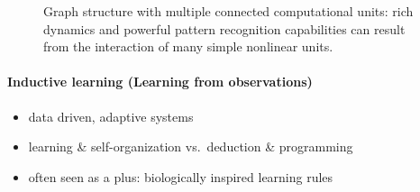 \begin{figure}[h] 
  \centering

\caption{Graph structure with multiple connected computational units:
  rich dynamics and powerful pattern recognition capabilities can
  result from the interaction of many simple nonlinear units.}
  \label{fig:graphStructure}
\end{figure}


\paragraph{Inductive learning (Learning from observations)} 
\begin{itemize}
	\item data driven, adaptive systems
	\item learning \& self-organization vs.\ deduction \& programming
	\item often seen as a plus: biologically inspired learning rules
\end{itemize}

\renewcommand{\descriptionlabel}[1]{\hspace{\labelsep}\emph{#1}}
